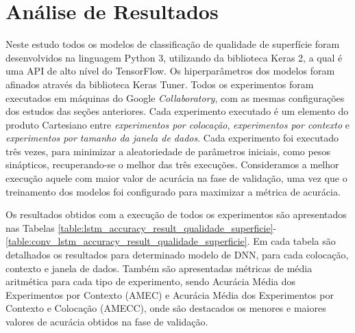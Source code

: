 \newpage
\section{Análise de Resultados}

Neste estudo todos os modelos de classificação de qualidade de superfície foram desenvolvidos na linguagem Python 3, utilizando da biblioteca Keras 2, a qual é uma API de alto nível do TensorFlow. Os hiperparâmetros dos modelos foram afinados através da biblioteca Keras Tuner. Todos os experimentos foram executados em máquinas do Google \textit{Collaboratory}, com as mesmas configurações dos estudos das seções anteriores. Cada experimento executado é um elemento do produto Cartesiano entre \emph{experimentos por colocação}, \emph{experimentos por contexto} e \emph{experimentos por tamanho da janela de dados}. Cada experimento foi executado três vezes, para minimizar a aleatoriedade de parâmetros iniciais, como pesos sinápticos, recuperando-se o melhor das três execuções. Consideramos a melhor execução aquele com maior valor de acurácia na fase de validação, uma vez que o treinamento dos modelos foi configurado para maximizar a métrica de acurácia.

Os resultados obtidos com a execução de todos os experimentos são apresentados nas Tabelas \ref{table:lstm_accuracy_result_qualidade_superficie}-\ref{table:conv_lstm_accuracy_result_qualidade_superficie}. Em cada tabela são detalhados os resultados para determinado modelo de DNN, para cada colocação, contexto e janela de dados. Também são apresentadas métricas de média aritmética para cada tipo de experimento, sendo Acurácia Média dos Experimentos por Contexto (AMEC) e Acurácia Média dos Experimentos por Contexto e Colocação (AMECC), onde são destacados os menores e maiores valores de acurácia obtidos na fase de validação.

